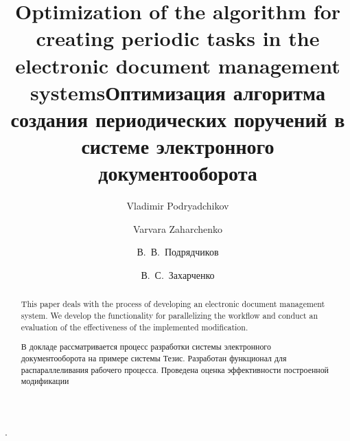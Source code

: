 \begin{englishtitle}
\title{Optimization of the algorithm for creating periodic tasks in the electronic document management systems}
\author{Vladimir Podryadchikov
\and
  Varvara Zaharchenko
}

\maketitle

\begin{abstract}
This paper deals with the process of developing an electronic document management system. We develop the functionality for parallelizing the workflow and conduct an evaluation of the effectiveness of the implemented modification.

\end{abstract}
\end{englishtitle}

\iffalse
\documentclass[12pt]{llncs}
\usepackage[T2A]{fontenc}
\usepackage[utf8]{inputenc}
\usepackage[english,russian]{babel}
\usepackage[russian]{nla}


\usepackage{multirow}


\fi

\title{Оптимизация алгоритма создания периодических поручений в системе электронного документооборота%
}
\author{В.~В.~Подрядчиков%
  \and
  В.~С.~Захарченко
}
.

\maketitle

\begin{abstract}
В докладе рассматривается процесс разработки системы электронного документооборота на примере системы Тезис. Разработан функционал для распараллеливания рабочего процесса. Проведена оценка эффективности построенной модификации

\end{abstract}


